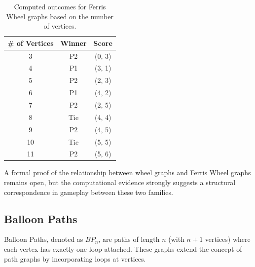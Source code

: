 \documentclass{article}
\begin{document}

\begin{table}[hbt!]
\centering
\begin{tabular}{|c|c|c|}
\hline
\textbf{\# of Vertices} & \textbf{Winner} & \textbf{Score} \\
\hline
3 & P2 & (0, 3) \\
4 & P1 & (3, 1) \\
5 & P2 & (2, 3) \\
6 & P1 & (4, 2) \\
7 & P2 & (2, 5) \\
8 & Tie & (4, 4) \\
9 & P2 & (4, 5) \\
10 & Tie & (5, 5) \\
11 & P2 & (5, 6) \\
\hline
\end{tabular}
\caption{Computed outcomes for Ferris Wheel graphs based on the number of vertices.}
\label{table:balloon-cycle-outcomes}
\end{table}
\FloatBarrier

A formal proof of the relationship between wheel graphs and Ferris Wheel graphs remains open, but the computational evidence strongly suggests a structural correspondence in gameplay between these two families.

\subsection{Balloon Paths}

Balloon Paths, denoted as $BP_n$, are paths of length $n$ (with $n+1$ vertices) where each vertex has exactly one loop attached. These graphs extend the concept of path graphs by incorporating loops at vertices.
\end{document}
